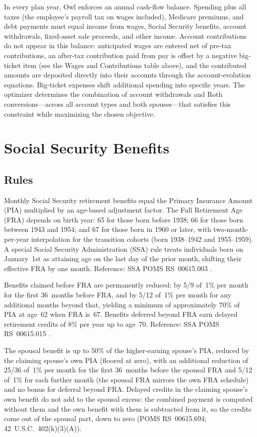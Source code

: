 \documentclass[fleqn,12pt]{report}
\begin{document}
In every plan year, Owl enforces an annual cash-flow balance.
Spending plus all taxes (the employee's payroll tax on wages included), Medicare premiums,
and debt payments must equal income from wages, Social Security benefits,
account withdrawals, fixed-asset sale proceeds, and other income.
Account contributions do not appear in this balance: anticipated wages are
entered net of pre-tax contributions, an after-tax contribution paid from pay
is offset by a negative big-ticket item (see the Wages and Contributions table
above), and the contributed amounts are deposited directly into their accounts
through the account-evolution equations.
Big-ticket expenses shift additional spending into specific years.
The optimizer determines the combination of account withdrawals and Roth
conversions---across all account types and both spouses---that satisfies
this constraint while maximizing the chosen objective.

\section{Social Security Benefits}
\label{sec:ss}

\subsection*{Rules}

Monthly Social Security retirement benefits equal the Primary Insurance Amount
(PIA) multiplied by an age-based adjustment factor.
The Full Retirement Age (FRA) depends on birth year: 65 for those born before
1938; 66 for those born between 1943 and 1954; and 67 for those born in 1960
or later, with two-month-per-year interpolation for the transition cohorts
(born 1938--1942 and 1955--1959).
A special Social Security Administration (SSA) rule treats individuals born on
January~1st as attaining age on the last day of the prior month, shifting their
effective FRA by one month.
Reference: SSA POMS RS~00615.003 \cite{ssa-poms}.

Benefits claimed before FRA are permanently reduced: by 5/9 of~1\% per month
for the first 36~months before FRA, and by 5/12 of~1\% per month for any
additional months beyond that, yielding a minimum of approximately 70\% of PIA
at age~62 when FRA is~67.
Benefits deferred beyond FRA earn delayed retirement credits of 8\% per year
up to age~70.
Reference: SSA POMS RS~00615.015 \cite{ssa-poms}.

The spousal benefit is up to 50\% of the higher-earning spouse's PIA, reduced
by the claiming spouse's own PIA (floored at zero), with an additional reduction
of 25/36 of~1\% per month for the first 36~months before the spousal FRA and
5/12 of~1\% for each further month (the spousal FRA mirrors the own FRA schedule) and no bonus for deferral beyond FRA.
Delayed credits in the claiming spouse's own benefit do not add to the spousal
excess: the combined payment is computed without them and the own benefit with
them is subtracted from it, so the credits come out of the spousal part, down to
zero (POMS RS~00615.694; 42~U.S.C.~402(k)(3)(A)).
\end{document}
